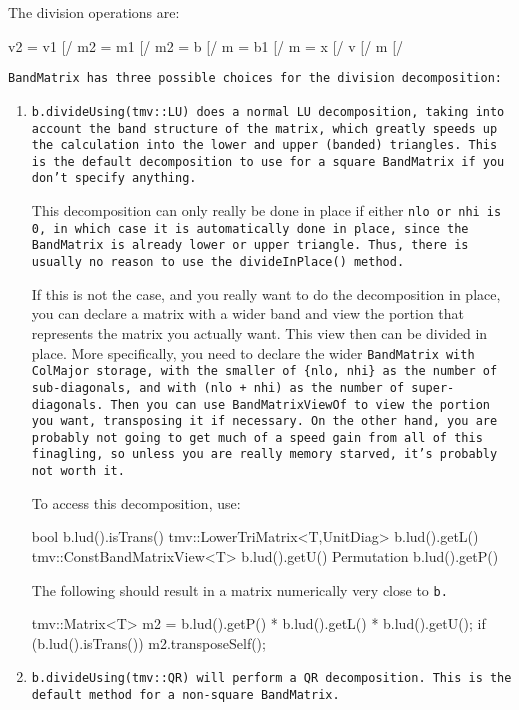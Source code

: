 The division operations are:
\begin{tmvcode}
v2 = v1 [/%
m2 = m1 [/%
m2 = b [/%
m = b1 [/%
m = x [/%
v [/%
m [/%
\end{tmvcode}
\tt{BandMatrix} has three possible choices for the division decomposition:
\begin{enumerate}
\item
\tt{b.divideUsing(tmv::LU)} does a normal LU decomposition,
taking into account the band structure of the matrix, which greatly speeds up 
the calculation into the lower and upper (banded) triangles.
This is the default decomposition to use for a square \tt{BandMatrix} 
if you don't specify anything.

This decomposition can only really
be done in place if either \tt{nlo} or \tt{nhi} is 0,
in which case it is automatically done in place,
since the \tt{BandMatrix} is already lower or upper triangle.
Thus, there is usually no reason to use the \tt{divideInPlace()} method.

If this is not the case, and you really want to do the decomposition in place, you can
declare a matrix with a wider band and view the portion that represents the matrix
you actually want.  This view then can be divided in place.  More specifically,
you need to declare the wider \tt{BandMatrix} with \tt{ColMajor} storage,
with the smaller of
\{\tt{nlo}, \tt{nhi}\} as the number of sub-diagonals, and with 
(\tt{nlo} + \tt{nhi}) as the number of super-diagonals.  
Then you can use \tt{BandMatrixViewOf} to view the portion you want, transposing it if
necessary.  On the other hand, you are probably not going to get much of a speed gain 
from all of this finagling, so unless you are really memory starved, it's probably not worth it.

To access this decomposition, use:
\begin{tmvcode}
bool b.lud().isTrans()
tmv::LowerTriMatrix<T,UnitDiag> b.lud().getL()
tmv::ConstBandMatrixView<T> b.lud().getU()
Permutation b.lud().getP()
\end{tmvcode}
The following should result in a matrix numerically very close to \tt{b}.
\begin{tmvcode}
tmv::Matrix<T> m2 = b.lud().getP() * b.lud().getL() * b.lud().getU();
if (b.lud().isTrans()) m2.transposeSelf();
\end{tmvcode}

\item
\tt{b.divideUsing(tmv::QR)} will perform a QR decomposition.  
This is the default method for a non-square \tt{BandMatrix}.


\end{enumerate}
